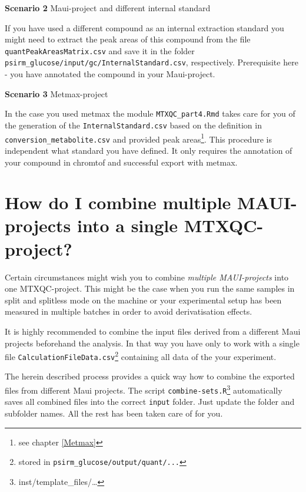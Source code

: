 \documentclass[]{book}
\let\rmarkdownfootnote\footnote%
\def\footnote{\protect\rmarkdownfootnote}
\theoremstyle{definition}
\theoremstyle{definition}
\theoremstyle{definition}
\theoremstyle{remark}
\begin{document}
\textbf{Scenario 2} Maui-project and different internal standard

If you have used a different compound as an internal extraction standard
you might need to extract the peak areas of this compound from the file
\texttt{quantPeakAreasMatrix.csv} and save it in the folder
\texttt{psirm\_glucose/input/gc/InternalStandard.csv}, respectively.
Prerequisite here - you have annotated the compound in your
Maui-project.

\textbf{Scenario 3} Metmax-project

In the case you used metmax the module \texttt{MTXQC\_part4.Rmd} takes
care for you of the generation of the \texttt{InternalStandard.csv}
based on the definition in \texttt{conversion\_metabolite.csv} and
provided peak areas\footnote{see chapter \ref{Metmax}}. This procedure
is independent what standard you have defined. It only requires the
annotation of your compound in chromtof and successful export with
metmax.

\section{How do I combine multiple MAUI-projects into a single
MTXQC-project?}\label{multipleproj}

Certain circumstances might wish you to combine \emph{multiple
MAUI-projects} into one MTXQC-project. This might be the case when you
run the same samples in split and splitless mode on the machine or your
experimental setup has been measured in multiple batches in order to
avoid derivatisation effects.

It is highly recommended to combine the input files derived from a
different Maui projects beforehand the analysis. In that way you have
only to work with a single file
\texttt{CalculationFileData.csv}\footnote{stored in
  \texttt{psirm\_glucose/output/quant/...}} containing all data of the
your experiment.

The herein described process provides a quick way how to combine the
exported files from different Maui projects. The script
\texttt{combine-sets.R}\footnote{inst/template\_files/\ldots{}}
automatically saves all combined files into the correct \texttt{input}
folder. Just update the folder and subfolder names. All the rest has
been taken care of for you.
\end{document}
